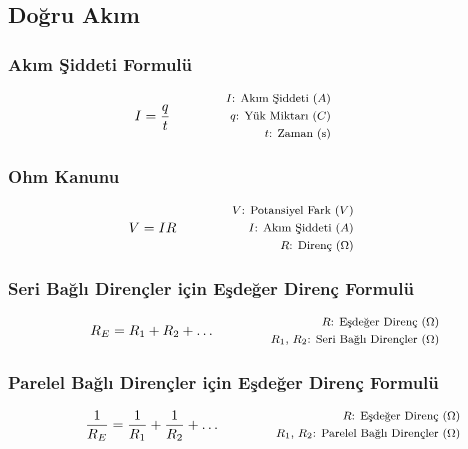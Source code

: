 \subsection{Doğru Akım}

\subsubsection*{Akım Şiddeti Formulü}
\begin{equation}
    I = \frac{q}{t} \qquad \qquad \parbox{4cm}{\footnotesize$\begin{aligned}
        I\text{: Akım Şiddeti } (A) \\
        q\text{: Yük Miktarı } (C) \\
        t\text{: Zaman (s)}
\end{aligned}$}
\end{equation}

\subsubsection*{Ohm Kanunu}
\begin{equation}
    V = IR \qquad \qquad \parbox{4cm}{\footnotesize$\begin{aligned}
        V\text{: Potansiyel Fark } (V) \\
        I\text{: Akım Şiddeti } (A) \\
        R\text{: Direnç } (\Omega)
\end{aligned}$}
\end{equation}

\subsubsection*{Seri Bağlı Dirençler için Eşdeğer Direnç Formulü}
\begin{equation}
    R_E = R_1 + R_2 + \dots \qquad \qquad \parbox{4cm}{\footnotesize$\begin{aligned}
        R\text{: Eşdeğer Direnç } (\Omega) \\
        R_1\text{, }R_2\text{: Seri Bağlı Dirençler } (\Omega)
\end{aligned}$}
\end{equation}

\subsubsection*{Parelel Bağlı Dirençler için Eşdeğer Direnç Formulü}
\begin{equation}
    \frac{1}{R_E} = \frac{1}{R_1} + \frac{1}{R_2} + \dots \qquad \qquad \parbox{4cm}{\footnotesize$\begin{aligned}
        R\text{: Eşdeğer Direnç } (\Omega) \\
        R_1\text{, }R_2\text{: Parelel Bağlı Dirençler } (\Omega)
\end{aligned}$}
\end{equation}

